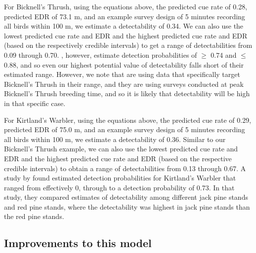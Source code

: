 \documentclass[12pt]{article}
\begin{document}
\par For Bicknell's Thrush, using the equations above, the predicted cue rate of 0.28, predicted EDR of 73.1 m, and an example survey design of 5 minutes recording all birds within 100 m, we estimate a detectability of 0.34.
We can also use the lowest predicted cue rate and EDR and the highest predicted cue rate and EDR (based on the respectively credible intervals) to get a range of detectabilities from 0.09 through 0.70.
\citet{aubry_bicknells_2018}, however, estimate detection probabilities of $\geq$ 0.74 and $\leq$ 0.88, and so even our highest potential value of detectability falls short of their estimated range.
However, we note that \citet{aubry_bicknells_2018} are using data that specifically target Bicknell's Thrush in their range, and they are using surveys conducted at peak Bicknell's Thrush breeding time, and so it is likely that detectability will be high in that specific case.

\par For Kirtland's Warbler, using the equations above, the predicted cue rate of 0.29, predicted EDR of 75.0 m, and an example survey design of 5 minutes recording all birds within 100 m, we estimate a detectability of 0.36.
Similar to our Bicknell's Thrush example, we can also use the lowest predicted cue rate and EDR and the highest predicted cue rate and EDR (based on the respective credible intervals) to obtain a range of detectabilities from 0.13 through 0.67.
A study by \citet{van_dyke_comparative_2022} found estimated detection probabilities for Kirtland's Warbler that ranged from effectively 0, through to a detection probability of 0.73.
In that study, they compared estimates of detectability among different jack pine stands and red pine stands, where the detectability was highest in jack pine stands than the red pine stands.

\subsection{Improvements to this model}
\end{document}
